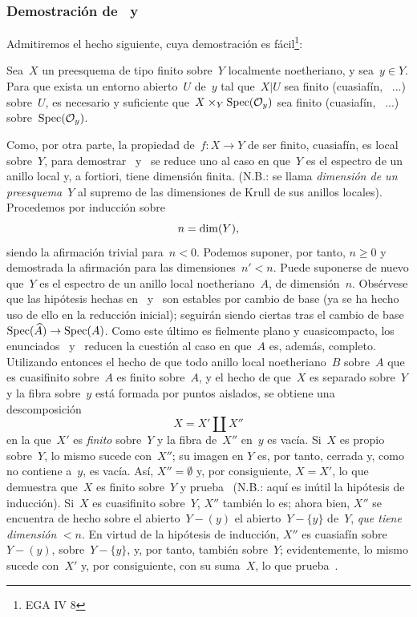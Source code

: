 \subsubsection*{Demostración de~ y~}
Admitiremos el hecho siguiente, cuya demostración es
fácil\footnote{\Cf EGA IV 8}:

\begin{lemme}
\label{VIII.6.5}
Sea~$X$ un preesquema de tipo finito sobre~$Y$ localmente noetheriano, y
sea~$y\in Y$. Para que exista un entorno abierto~$U$ de~$y$ tal que~$X|U$
sea finito (\resp cuasiafín, \resp\ ...) sobre~$U$, es necesario y suficiente
que~$X\times_{Y}\operatorname{Spec}(\mathcal{O}_{y})$ sea finito (\resp cuasiafín,
\resp\ ...) sobre~$\operatorname{Spec}(\mathcal{O}_{y})$.
\end{lemme}

Como, por otra parte, la propiedad de~$f\colon X\to Y$ de ser finito,
\resp cuasiafín, es local sobre~$Y$, para demostrar~
y~ se reduce uno al caso en que~$Y$ es el espectro de un anillo
local y, a fortiori, tiene dimensión finita. (N.B.: se llama
\emph{dimensión de un preesquema}~$Y$ al supremo de las dimensiones de Krull
de sus anillos locales). Procedemos por inducción sobre
$$
n=\dim(Y),
$$
siendo la afirmación
trivial para~$n<0$. Podemos suponer, por tanto, $n\geq 0$ y demostrada la
afirmación para las dimensiones~$n'<n$. Puede suponerse de nuevo que~$Y$ es
el espectro de un anillo local noetheriano~$A$, de dimensión~$n$. Obsérvese
que las hipótesis hechas en~ y~ son estables por
cambio de base (ya se ha hecho uso de ello en la reducción inicial); seguirán
siendo ciertas tras el cambio de base~$\operatorname{Spec}(\widehat{A})\to \operatorname{Spec}(A)$. Como
este último es fielmente plano y cuasicompacto, los
enunciados~ y~ reducen la cuestión al caso en
que~$A$ es, además, completo. Utilizando entonces el hecho de que todo anillo
local noetheriano~$B$ sobre~$A$ que es cuasifinito sobre~$A$ es finito
sobre~$A$, y el hecho de que~$X$ es separado sobre~$Y$ y la fibra sobre~$y$ está formada por
puntos aislados, se obtiene una descomposición
$$
X=X'\amalg X''
$$
en la que~$X'$ es \emph{finito} sobre~$Y$ y la fibra de~$X''$ en~$y$ es
vacía. Si~$X$ es propio sobre~$Y$, lo mismo sucede con~$X''$; su imagen en
$Y$ es, por tanto, cerrada y, como no contiene a~$y$, es vacía. Así,
$X''=\emptyset$ y, por consiguiente, $X=X'$, lo que demuestra que~$X$ es
finito sobre~$Y$ y prueba~ (N.B.: aquí es inútil la hipótesis
de inducción). Si~$X$ es cuasifinito sobre~$Y$, $X''$ también lo es; ahora
bien, $X''$ se encuentra de hecho sobre
{el abierto~$Y-(y)$}
{el abierto~$Y-\{ y\}$}
de~$Y$, \emph{que tiene dimensión} $<n$. En virtud de la hipótesis de
inducción, $X''$ es cuasiafín
{sobre~$Y-(y)$,}
{sobre~$Y-\{ y\}$,}
y, por tanto, también sobre~$Y$; evidentemente, lo mismo sucede con~$X'$ y,
por consiguiente, con su suma~$X$, lo que prueba~.


